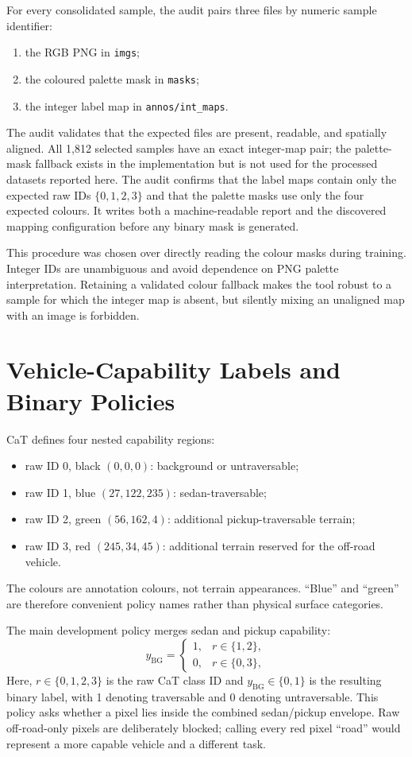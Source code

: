 For every consolidated sample, the audit pairs three files by numeric sample
identifier:
\begin{enumerate}
  \item the RGB PNG in \texttt{imgs};
  \item the coloured palette mask in \texttt{masks};
  \item the integer label map in \texttt{annos/int\_maps}.
\end{enumerate}
The audit validates that the expected files are present, readable, and
spatially aligned. All 1,812 selected samples have an exact integer-map pair;
the palette-mask fallback exists in the implementation but is not used for the
processed datasets reported here. The audit confirms that the label maps
contain only the expected raw IDs $\{0,1,2,3\}$ and that the palette masks use
only the four expected colours. It writes both a machine-readable report and
the discovered mapping configuration before any binary mask is generated.

This procedure was chosen over directly reading the colour masks during
training. Integer IDs are unambiguous and avoid dependence on PNG palette
interpretation. Retaining a validated colour fallback makes the tool robust to
a sample for which the integer map is absent, but silently mixing an
unaligned map with an image is forbidden.

\section{Vehicle-Capability Labels and Binary Policies}

CaT defines four nested capability regions:
\begin{itemize}
  \item raw ID 0, black $(0,0,0)$: background or untraversable;
  \item raw ID 1, blue $(27,122,235)$: sedan-traversable;
  \item raw ID 2, green $(56,162,4)$: additional pickup-traversable terrain;
  \item raw ID 3, red $(245,34,45)$: additional terrain reserved for the
  off-road vehicle.
\end{itemize}
The colours are annotation colours, not terrain appearances. ``Blue'' and
``green'' are therefore convenient policy names rather than physical surface
categories.

The main development policy merges sedan and pickup capability:
\begin{equation}
 y_{\mathrm{BG}} =
 \begin{cases}
 1,&r\in\{1,2\},\\
 0,&r\in\{0,3\},
 \end{cases}
 \label{eq:blue_green_mapping}
\end{equation}
Here, $r\in\{0,1,2,3\}$ is the raw CaT class ID and
$y_{\mathrm{BG}}\in\{0,1\}$ is the resulting binary label, with 1 denoting
traversable and 0 denoting untraversable. This policy asks whether a pixel lies inside the
combined sedan/pickup envelope. Raw off-road-only pixels are deliberately
blocked; calling every red pixel ``road'' would represent a more capable
vehicle and a different task.

